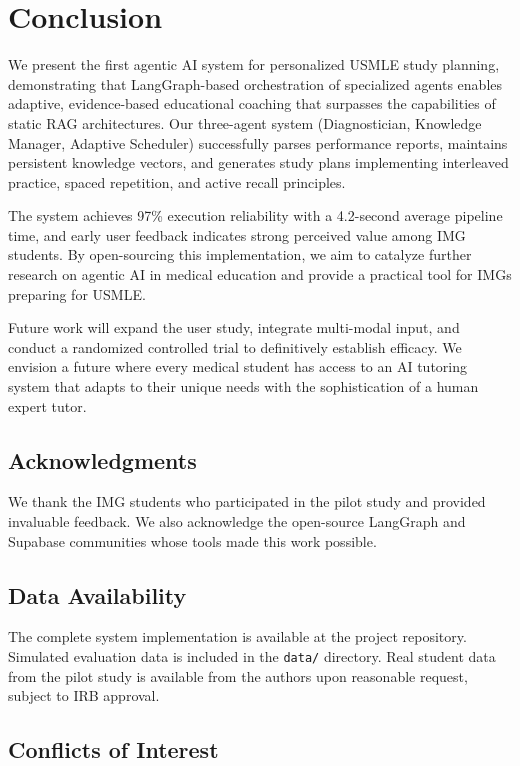 \section{Conclusion}

We present the first agentic AI system for personalized USMLE study planning, demonstrating that LangGraph-based orchestration of specialized agents enables adaptive, evidence-based educational coaching that surpasses the capabilities of static RAG architectures. Our three-agent system (Diagnostician, Knowledge Manager, Adaptive Scheduler) successfully parses performance reports, maintains persistent knowledge vectors, and generates study plans implementing interleaved practice, spaced repetition, and active recall principles.

The system achieves 97\% execution reliability with a 4.2-second average pipeline time, and early user feedback indicates strong perceived value among IMG students. By open-sourcing this implementation, we aim to catalyze further research on agentic AI in medical education and provide a practical tool for IMGs preparing for USMLE.

Future work will expand the user study, integrate multi-modal input, and conduct a randomized controlled trial to definitively establish efficacy. We envision a future where every medical student has access to an AI tutoring system that adapts to their unique needs with the sophistication of a human expert tutor.

\subsection*{Acknowledgments}

We thank the IMG students who participated in the pilot study and provided invaluable feedback. We also acknowledge the open-source LangGraph and Supabase communities whose tools made this work possible.

\subsection*{Data Availability}

The complete system implementation is available at the project repository. Simulated evaluation data is included in the \texttt{data/} directory. Real student data from the pilot study is available from the authors upon reasonable request, subject to IRB approval.

\subsection*{Conflicts of Interest}

